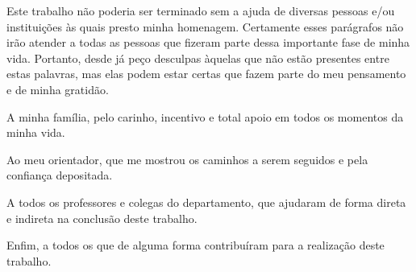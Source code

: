 
\begin{agradecimentos}%

Este trabalho não poderia ser terminado sem a ajuda de diversas pessoas e/ou instituições às quais presto minha homenagem. Certamente esses parágrafos não irão atender a todas as pessoas que fizeram parte dessa importante fase de minha vida. Portanto, desde já peço desculpas àquelas que não estão presentes entre estas palavras, mas elas podem estar certas que fazem parte do meu pensamento e de minha gratidão.

A minha família, pelo carinho, incentivo e total apoio em todos os momentos da minha vida.

Ao meu orientador, que me mostrou os caminhos a serem seguidos e pela confiança depositada.

A todos os professores e colegas do departamento, que ajudaram de forma direta e indireta na conclusão deste trabalho.

Enfim, a todos os que de alguma forma contribuíram para a realização deste trabalho.
\end{agradecimentos}
